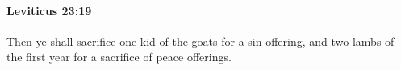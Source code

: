 
		\paragraph{Leviticus 23:19} %
			\label{LEVITICUS-23-19}

			Then ye shall sacrifice one kid of the goats for a sin offering, and two lambs of the first year for a sacrifice of peace offerings.



